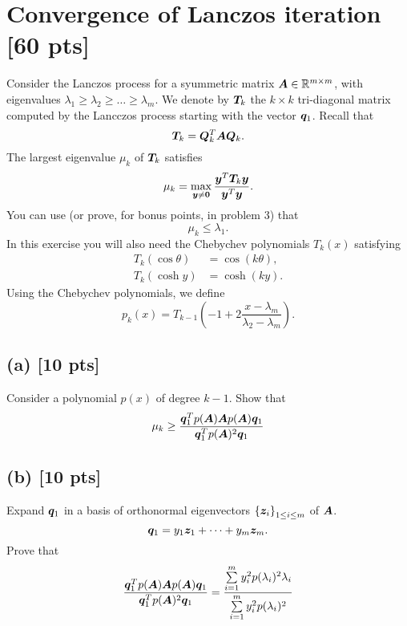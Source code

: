 \documentclass[twoside,10pt]{article}
\begin{document}
\section{Convergence of Lanczos iteration [60 pts]}
Consider the Lanczos process for a syummetric matrix $\bm{A} \in \mathbb{R}^{m \times m}$, with eigenvalues $\lambda_{1} \geq \lambda_{2} \geq \dots \geq \lambda_{m}$.  
We denote by $\bm{T}_k$ the $k \times k$ tri-diagonal matrix computed by the Lancczos process starting with the vector $\bm{q}_1$. 
Recall that
\begin{equation}
  \bm{T}_k = \bm{Q}^T_k \bm{A} \bm{Q}_k.
\end{equation}
The largest eigenvalue $\mu_k$ of $\bm{T}_k$ satisfies
\begin{equation}
  \mu_{k} = \max \limits_{\bm{y} \neq \bm{0}} \frac{\bm{y}^T \bm{T}_k \bm{y}}{\bm{y}^T \bm{y}}.
\end{equation}
You can use (or prove, for bonus points, in problem 3) that 
\begin{equation}
  \mu_{k} \leq \lambda_1.
\end{equation}
In this exercise you will also need the Chebychev polynomials $T_k(x)$ satisfying  
\begin{align}
  T_k\left(\cos \theta\right) &= \cos\left(k \theta \right),\\
  T_k\left(\cosh y\right) &= \cosh\left(k y \right).
\end{align}
Using the Chebychev polynomials, we define 
\begin{equation}
  p_k(x) = T_{k - 1} \left( - 1 + 2 \frac{x - \lambda_m}{\lambda_2 - \lambda_m}\right).
\end{equation}

\subsection*{(a) [10 pts]}
Consider a polynomial $p(x)$ of degree $k - 1$.
Show that
\begin{equation}
  \mu_k \geq \frac{\bm{q}_1^T p(\bm{A}) \bm{A} p(\bm{A}) \bm{q}_1}{\bm{q}_1^T p(\bm{A})^2 \bm{q}_1}
\end{equation}

\subsection*{(b) [10 pts]}
Expand $\bm{q}_1$ in a basis of orthonormal eigenvectors $\left\{\vct{z}_i\right\}_{1 \leq i \leq m}$ of $\bm{A}$.
\begin{equation}
  \bm{q}_1 = y_1 \bm{z}_1 + \dots + y_m \bm{z}_m. 
\end{equation}
Prove that 
\begin{equation}
  \frac{\bm{q}_1^T p(\bm{A}) \bm{A} p(\bm{A}) \bm{q}_1}{\bm{q}_1^T p(\bm{A})^2 \bm{q}_1} = \frac{\sum \limits_{i = 1}^{m} y_{i}^2 p(\lambda_i)^2 \lambda_{i}}{\sum \limits_{i = 1}^{m} y_{i}^2 p(\lambda_i)^2}
\end{equation}
\end{document}

